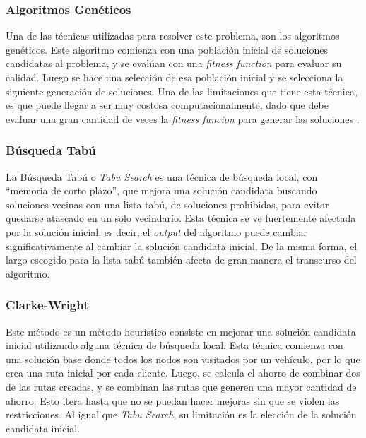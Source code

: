 \documentclass[letter, 10pt]{article}
\begin{document}
\subsubsection{Algoritmos Genéticos}
Una de las técnicas utilizadas para resolver este problema, son los algoritmos genéticos. Este algoritmo comienza con una población inicial de soluciones candidatas al problema, y se evalúan con una \textit{fitness function} para evaluar su calidad. Luego se hace una selección de esa población inicial y se selecciona la siguiente generación de soluciones. Una de las limitaciones que tiene esta técnica, es que puede llegar a ser muy costosa computacionalmente, dado que debe evaluar una gran cantidad de veces la \textit{fitness funcion} para generar las soluciones \cite{ge2023genetic}. 

\subsubsection{Búsqueda Tabú}
La Búsqueda Tabú o \textit{Tabu Search} es una técnica de búsqueda local, con ``memoria de corto plazo'', que mejora una solución candidata buscando soluciones vecinas con una lista tabú, de soluciones prohibidas, para evitar quedarse atascado en un solo vecindario. Esta técnica se ve fuertemente afectada por la solución inicial, es decir, el \textit{output} del algoritmo puede cambiar significativamente al cambiar la solución candidata inicial. De la misma forma, el largo escogido para la lista tabú también afecta de gran manera el transcurso del algoritmo. \cite{xu2022model}
\subsubsection{Clarke-Wright}
Este método es un método heurístico consiste en mejorar una solución candidata inicial utilizando alguna técnica de búsqueda local. Esta técnica comienza con una solución base donde todos los nodos son visitados por un vehículo, por lo que crea una ruta inicial por cada cliente. Luego, se calcula el ahorro de combinar dos de las rutas creadas, y se combinan las rutas que generen una mayor cantidad de ahorro. Esto itera hasta que no se puedan hacer mejoras sin que se violen las restricciones. Al igual que \textit{Tabu Search}, su limitación es la elección de la solución candidata inicial\cite{talarico2015metaheuristics}\cite{talarico2017large}.
\end{document}
